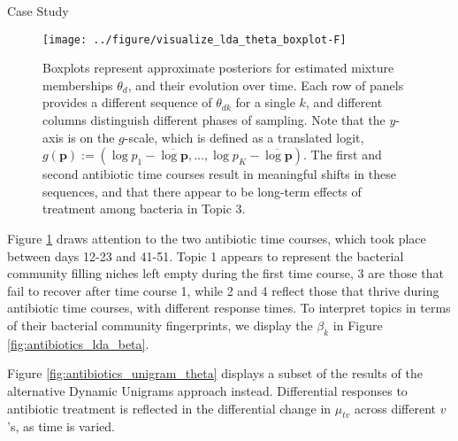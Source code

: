 \documentclass[final, 8pt]{beamer}
\newlength{\onecolwid}
\begin{document}
\begin{frame}
\begin{columns}
\begin{column}{\onecolwid}
\begin{block}{Case Study}
\end{block}

\begin{figure}[!p]
  \centering\texttt{[image: ../figure/visualize\_lda\_theta\_boxplot-F]}
  \caption{Boxplots represent approximate posteriors for estimated mixture
    memberships $\theta_{d}$, and their evolution over time. Each row of panels
    provides a different sequence of $\theta_{dk}$ for a single $k$, and
    different columns distinguish different phases of sampling. Note that the
    $y$-axis is on the $g$-scale, which is defined as a translated logit,
    $g\left(\mathbf{p}\right) := \left(\log p_{1} - \overline{\log \mathbf{p}},
    \dots,\log p_{K} - \overline{\log \mathbf{p}}\right)$. The first and second
    antibiotic time courses result in meaningful shifts in these sequences, and
    that there appear to be long-term effects of treatment among bacteria in
    Topic 3. \label{fig:antibiotics_lda_theta}}
\end{figure}

\begin{block}{}
Figure \ref{fig:antibiotics_lda_theta} draws attention to the two antibiotic
time courses, which took place between days 12-23 and 41-51. Topic 1 appears to
represent the bacterial community filling niches left empty during the first
time course, 3 are those that fail to recover after time course 1, while 2 and 4
reflect those that thrive during antibiotic time courses, with different
response times. To interpret topics in terms of their bacterial community
fingerprints, we display the $\beta_{k}$ in Figure
\ref{fig:antibiotics_lda_beta}.

Figure \ref{fig:antibiotics_unigram_theta} displays a subset of the results of
the alternative Dynamic Unigrams approach instead. Differential responses to
antibiotic treatment is reflected in the differential change in $\mu_{tv}$
across different $v$'s, as time is varied.
\end{block}


\end{column}
\end{columns}
\end{frame}
\end{document}
